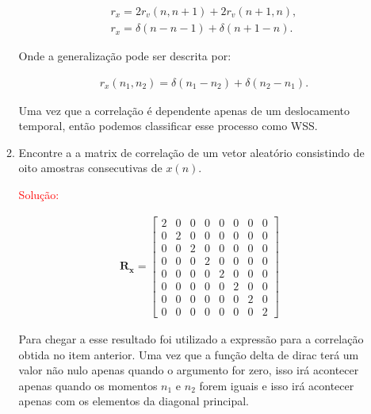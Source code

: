 \documentclass[a4paper,10pt]{article}
\begin{document}
\begin{enumerate}
\begin{enumerate}
				 		\begin{align}
				 			&r_{x} = 2r_{v}(n,n+1) + 2r_{v}(n+1,n), \\
				 			&r_{x} = \delta(n - n - 1) + \delta(n + 1 - n).
				 		\end{align}
				 		
				 		Onde a generalização pode ser descrita por:
				 		
				 		\begin{align}
				 			&r_{x}(n_{1}, n_{2})= \delta(n_{1} - n_{2}) + \delta(n_{2} - n_{1}).  
				 		\end{align}
				 		
				 		Uma vez que a correlação é dependente apenas de um deslocamento temporal, então podemos classificar esse processo como WSS.
			 		
			 		\item Encontre a a matrix de correlação de um vetor aleatório consistindo de oito amostras consecutivas de
			 		$x(n)$.
			 		
				 		\textcolor{red}{Solução:}
				 		
				 		\begin{align}
				 			\mathbf{R}_{\mathbf{x}} = \left[
				 			\begin{matrix}
				 				2 & 0 & 0 & 0 & 0 & 0 & 0 & 0\\
				 				0 & 2 & 0 & 0 & 0 & 0 & 0 & 0\\
				 				0 & 0 & 2 & 0 & 0 & 0 & 0 & 0\\
				 				0 & 0 & 0 & 2 & 0 & 0 & 0 & 0\\
				 				0 & 0 & 0 & 0 & 2 & 0 & 0 & 0\\
				 				0 & 0 & 0 & 0 & 0 & 2 & 0 & 0\\
				 				0 & 0 & 0 & 0 & 0 & 0 & 2 & 0\\
				 				0 & 0 & 0 & 0 & 0 & 0 & 0 & 2
				 			\end{matrix}
				 			\right]
				 		\end{align}
				 		
				 		Para chegar a esse resultado foi utilizado a expressão para a correlação obtida no item anterior. Uma vez que a função delta de dirac terá um valor não nulo apenas quando o argumento for zero, isso irá acontecer apenas quando os momentos $n_{1}$ e $n_{2}$ forem iguais e isso irá acontecer apenas com os elementos da diagonal principal.
			 		
			 	\end{enumerate}
		 	
		\end{enumerate}
		
\end{document}
